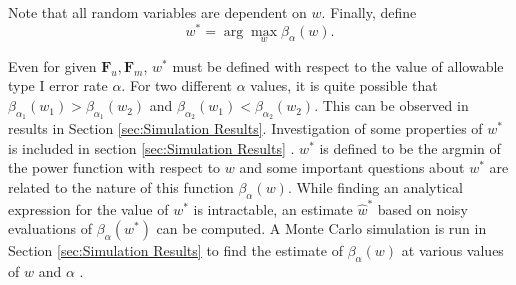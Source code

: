\documentclass[11pt]{article} %
\begin{document}
 Note that all random variables are dependent on $w$. Finally, define $$w^{*}=\arg\max_w{\beta_{\alpha}\left( w\right)}. $$


Even for  given $\mathbf{F}_u,\mathbf{F}_m$,   $w^*$ must be defined with respect to the value of allowable type I error rate $\alpha$.  For two different $\alpha$ values, it is quite possible that $\beta_{\alpha_1}(w_1)>\beta_{\alpha_1}(w_2)$  and $\beta_{\alpha_2}(w_1)<\beta_{\alpha_2}(w_2)$. This can be observed in results in Section \ref{sec:Simulation Results}.  
Investigation of some  properties of $w^{*}$  is included in section  \ref{sec:Simulation Results} .
 $w^*$ is defined to be the argmin of  the power function with respect to $w$ and some important questions about $w^*$ are  related to the nature of this function $\beta_{\alpha}\left( w\right)$.
While finding an analytical expression for the value of $w^*$ is intractable, an estimate $\hat{w}^*$  based on noisy evaluations of $\beta_{\alpha}(w^*)$ can be computed.  A Monte Carlo simulation is run in  Section  \ref{sec:Simulation Results} 
to find the estimate of $\beta_{\alpha}\left( w\right)$ at various values of $w$ and $\alpha$ .
\end{document}
